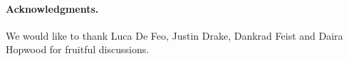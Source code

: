 \documentclass{article}
\theoremstyle{definition}
\begin{document}

\bigskip
\paragraph*{\textbf{Acknowledgments.}} We would like to thank Luca De
Feo, Justin Drake, Dankrad Feist and Daira Hopwood for
fruitful discussions.



\end{document}
